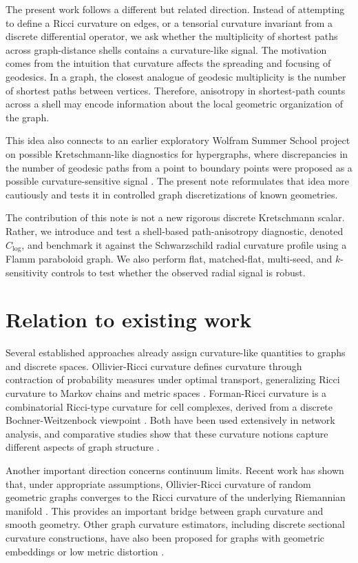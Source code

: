 \documentclass[11pt]{article}
\begin{document}
The present work follows a different but related direction. Instead of attempting to define a Ricci curvature on edges, or a tensorial curvature invariant from a discrete differential operator, we ask whether the multiplicity of shortest paths across graph-distance shells contains a curvature-like signal. The motivation comes from the intuition that curvature affects the spreading and focusing of geodesics. In a graph, the closest analogue of geodesic multiplicity is the number of shortest paths between vertices. Therefore, anisotropy in shortest-path counts across a shell may encode information about the local geometric organization of the graph.

This idea also connects to an earlier exploratory Wolfram Summer School project on possible Kretschmann-like diagnostics for hypergraphs, where discrepancies in the number of geodesic paths from a point to boundary points were proposed as a possible curvature-sensitive signal \cite{Palomino2021}. The present note reformulates that idea more cautiously and tests it in controlled graph discretizations of known geometries.

The contribution of this note is not a new rigorous discrete Kretschmann scalar. Rather, we introduce and test a shell-based path-anisotropy diagnostic, denoted $C_{\log}$, and benchmark it against the Schwarzschild radial curvature profile using a Flamm paraboloid graph. We also perform flat, matched-flat, multi-seed, and $k$-sensitivity controls to test whether the observed radial signal is robust.

\section{Relation to existing work}

Several established approaches already assign curvature-like quantities to graphs and discrete spaces. Ollivier-Ricci curvature defines curvature through contraction of probability measures under optimal transport, generalizing Ricci curvature to Markov chains and metric spaces \cite{Ollivier2009}. Forman-Ricci curvature is a combinatorial Ricci-type curvature for cell complexes, derived from a discrete Bochner-Weitzenbock viewpoint \cite{Forman2003}. Both have been used extensively in network analysis, and comparative studies show that these curvature notions capture different aspects of graph structure \cite{Samal2018}.

Another important direction concerns continuum limits. Recent work has shown that, under appropriate assumptions, Ollivier-Ricci curvature of random geometric graphs converges to the Ricci curvature of the underlying Riemannian manifold \cite{VanDerHoorn2021}. This provides an important bridge between graph curvature and smooth geometry. Other graph curvature estimators, including discrete sectional curvature constructions, have also been proposed for graphs with geometric embeddings or low metric distortion \cite{DuPlessis2023}.
\end{document}
